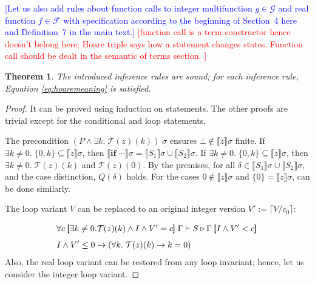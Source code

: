 \documentclass{article}
\newtheorem{theorem}{Theorem}
\newcommand{\Martin}[1]{\textcolor{blue}{#1}}
\newcommand{\Sewon}[1]{\textcolor{red}{#1}}
\newcommand{\sem}[1]{\llbracket #1 \rrbracket }
\newcommand{\trans}[1]{\mathcal{T}( #1) }
\newcommand{\asser}[1]{ \;\pmb{[\vphantom{\frac{1}{2}}} #1 \pmb{\vphantom{\frac{1}{2}}]\;}
 }
\begin{document}
\Martin{[Let us also add rules about function calls to 
integer multifunction $g\in\mathcal{G}$ and real function $f\in\mathcal{F}$
with specification according to the beginning of Section~4 here
and Definition~7 in the main text.]}
\Sewon{[function call is a term constructor hence doesn't belong here;
Hoare triple says how a statement changes states.
Function call should be dealt in the semantic of terms section.
]}

\begin{theorem}\label{t:hoaresound}
The introduced inference rules are sound; for each inference rule, Equation \ref{eq:hoaremeaning} 
is satisfied.
\end{theorem}
\begin{proof}
It can be proved using induction on statements.
The other proofs are trivial except for the conditional and loop statements.

\vspace{.5em}
The precondition $(P\land \exists k.\;\trans{z}(k))\;\sigma$ ensures $\bot\not\in\sem{z}\sigma$ finite.
If $\exists k\neq0.\; \{0,k\} \subseteq \sem{z}\sigma$, then 
$\sem{\textbf{if}\;\cdots}\sigma = \sem{S_1}\sigma \cup \sem{S_2}\sigma$.
If $\exists k\neq0.\;\{0,k\} \subseteq \sem{z}\sigma$,
then $\exists k\neq0.\;\trans{z}(k)$ and $\trans{z}(0)$.
By the premises, for all $\delta\in\sem{S_1}\sigma\cup\sem{S_2}\sigma$, 
and the case distinction, $Q(\delta)$ holds. For the cases $0\not\in \sem{z}\sigma$ and
$\{0\}=\sem{z}\sigma$, can be done similarly.
 
 \vspace{.5em}
  The loop variant $V$ can be replaced to an original integer version
 $V' := \lceil V/c_0\rceil$:
\begin{align*}
&\forall c\asser{\exists k\neq0. \trans{z}(k) \land I\land V' = c} \Gamma \vdash S \triangleright \Gamma\asser{I\land V' < c}\\
&I\land V' \leq0\to(\forall k.\;\trans{z}(k)\to k=0)
\end{align*}
Also, the real loop variant can be restored from any loop invariant; hence, let us consider the integer loop variant.
 

\end{proof}
\end{document}
